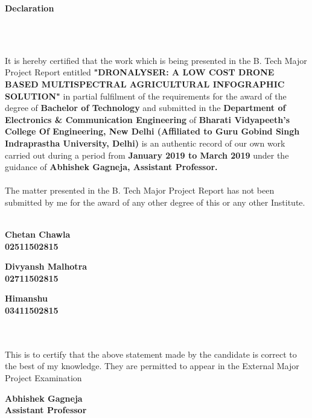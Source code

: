 \newpage
\begin{center}
\thispagestyle{empty}
\LARGE{\textbf{Declaration}}\\[1cm]
\end{center}
\linespread{1.13}
\\
\\
\large{It is hereby certified that the work which is being presented in the B. Tech Major Project Report entitled \textbf{"DRONALYSER: A LOW COST DRONE BASED MULTISPECTRAL AGRICULTURAL INFOGRAPHIC SOLUTION"} in partial fulfilment of the requirements for the award of the degree of \textbf{Bachelor of Technology} and submitted in the \textbf{Department of Electronics & Communication Engineering} of \textbf{Bharati Vidyapeeth's College Of Engineering, New Delhi (Affiliated to Guru Gobind Singh Indraprastha University, Delhi)} is an authentic record of our own work carried out during a period from \textbf{January 2019 to March 2019} under the guidance of \textbf{Abhishek Gagneja, Assistant Professor.}
\\
\\
The matter presented in the B. Tech Major Project Report has not been submitted by me for the award of any other degree of this or any other Institute. 
\vspace{0.8in}
\\
\\
\begin{minipage}{0.35\linewidth}
\begin{center}
\textbf{Chetan Chawla\\
02511502815}
\end{center}
\end{minipage}
\begin{minipage}{0.30\linewidth}
\begin{center}
\textbf{Divyansh Malhotra\\
02711502815}    
\end{center}
\end{minipage}
\begin{minipage}{0.30\linewidth}
\begin{center}
\textbf{Himanshu\\
03411502815}    
\end{center}
\end{minipage}
\vspace{0.2in}
\\
\\
This is to certify that the above statement made by the candidate is correct to the best of my knowledge. They are permitted to appear in the External Major Project Examination
\vspace{1in}
\\

\begin{flushright}
\textbf{Abhishek Gagneja\\
Assistant Professor}
\end{flushright}
}